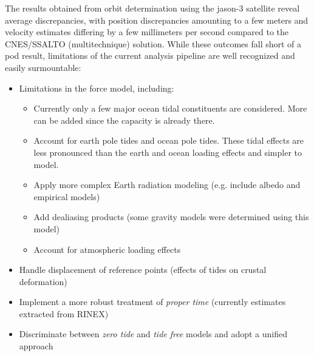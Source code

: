 \iffalse
Results obtained for the case of orbit determination using the \gls{jason}-3 satellite, 
show average discrepancies, with respect to the \gls{cnes}/SSALTO (multitechnique) solution, 
that amount to a few \si{\meter} in position and a few \si{\milli\meter\per\sec} for 
velocity estimates. Evidently, this cannot be qualified as a \gls{pod} result, but limitations 
of the current analysis pipeline are well identified and easy to transcend. These are
\fi
The results obtained from orbit determination using the \gls{jason}-3 satellite 
reveal average discrepancies, with position discrepancies amounting to a few 
meters and velocity estimates differing by a few millimeters per second compared 
to the CNES/SSALTO (multitechnique) solution. While these outcomes fall short of 
a \gls{pod} result, limitations of the current analysis pipeline are well 
recognized and easily surmountable:
\begin{itemize}
  \item Limitations in the force model, including:
    \begin{itemize}
      \item Currently only a few major ocean tidal constituents are considered. More 
        can be added since the capacity is already there.
      \item Account for earth pole tides and ocean pole tides. These 
        tidal effects are less pronounced than the earth and ocean loading effects and 
        simpler to model.
      \item Apply more complex Earth radiation modeling (e.g. include albedo and empirical models)
      \item Add dealiasing products (some gravity models were determined using this model)
      \item Account for atmospheric loading effects
    \end{itemize}
  \item Handle displacement of reference points (effects of tides on crustal deformation)
  \item Implement a more robust treatment of \emph{proper time} (currently estimates extracted from RINEX)
  \item Discriminate between \emph{zero tide} and \emph{tide free} models and adopt a unified approach
\end{itemize}

